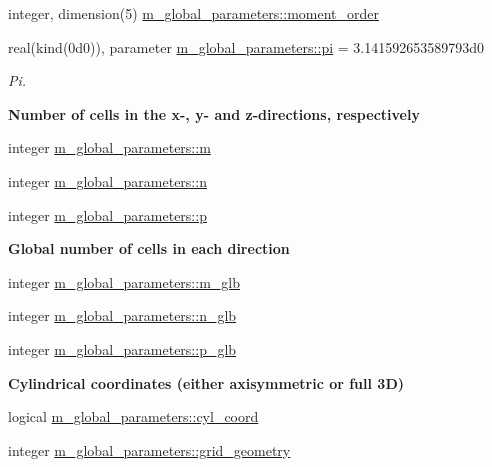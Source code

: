 \begin{DoxyCompactItemize}
\item 
integer, dimension(5) \hyperlink{namespacem__global__parameters_a4ddb20fdeec324ed6100359e83111a7c}{m\+\_\+global\+\_\+parameters\+::moment\+\_\+order}
\item 
real(kind(0d0)), parameter \hyperlink{namespacem__global__parameters_a21765a90c01d221524670d1344b126cd}{m\+\_\+global\+\_\+parameters\+::pi} = 3.\+141592653589793d0
\begin{DoxyCompactList}\small\item\em Pi. \end{DoxyCompactList}\end{DoxyCompactItemize}
\begin{Indent}\textbf{ Number of cells in the x-\/, y-\/ and z-\/directions, respectively}\par
\begin{DoxyCompactItemize}
\item 
integer \hyperlink{namespacem__global__parameters_aee38c9d03e9195858a93ec611b605f33}{m\+\_\+global\+\_\+parameters\+::m}
\item 
integer \hyperlink{namespacem__global__parameters_ac72422e5f77149bd32cf0cfd01a36544}{m\+\_\+global\+\_\+parameters\+::n}
\item 
integer \hyperlink{namespacem__global__parameters_ac040dbf547e6d5de8df08e864d8131e7}{m\+\_\+global\+\_\+parameters\+::p}
\end{DoxyCompactItemize}
\end{Indent}
\begin{Indent}\textbf{ Global number of cells in each direction}\par
\begin{DoxyCompactItemize}
\item 
integer \hyperlink{namespacem__global__parameters_ad4e160df8d0de7ea1801a1ca29f8e9b0}{m\+\_\+global\+\_\+parameters\+::m\+\_\+glb}
\item 
integer \hyperlink{namespacem__global__parameters_adab11dab474410541d4c37725bea01e1}{m\+\_\+global\+\_\+parameters\+::n\+\_\+glb}
\item 
integer \hyperlink{namespacem__global__parameters_a1072f221ca8e41b0ea3240b33374cc1e}{m\+\_\+global\+\_\+parameters\+::p\+\_\+glb}
\end{DoxyCompactItemize}
\end{Indent}
\begin{Indent}\textbf{ Cylindrical coordinates (either axisymmetric or full 3D)}\par
\begin{DoxyCompactItemize}
\item 
logical \hyperlink{namespacem__global__parameters_a53f0d5eed7783c9760aaeeaa0abbd58c}{m\+\_\+global\+\_\+parameters\+::cyl\+\_\+coord}
\item 
integer \hyperlink{namespacem__global__parameters_a0f2d413d9739928f8e1a98f0a5783ab9}{m\+\_\+global\+\_\+parameters\+::grid\+\_\+geometry}
\end{DoxyCompactItemize}
\end{Indent}
